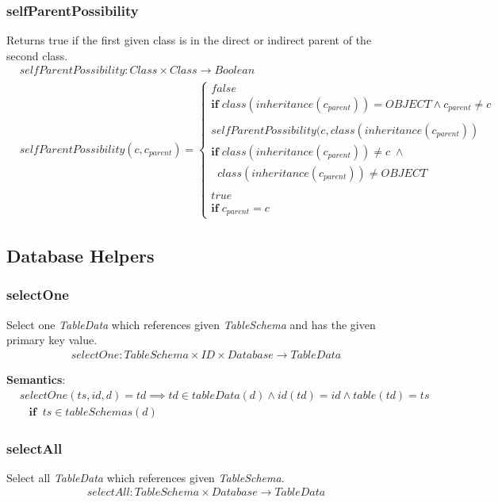 \documentclass[10pt]{article}
\begin{document}
\subsubsection{selfParentPossibility}
Returns true if the first given class is in the direct or indirect parent of the second class. 
\begin{align}
& selfParentPossibility: Class \times  Class \rightarrow Boolean \\
& selfParentPossibility(c, c_{parent}) = \begin{cases}
 false \\
 \mathbf{if} \; class(inheritance(c_{parent})) = OBJECT \land c_{parent} \neq c \\\\
 selfParentPossibility(c, class(inheritance(c_{parent}))\\
 \mathbf{if} \; class(inheritance(c_{parent})) \neq c \; \land  \\ \;\; class(inheritance(c_{parent})) \neq OBJECT \\\\
 true \\
 \mathbf{if} \; c_{parent} = c
 \end{cases}
\end{align}

\subsection{Database Helpers}
\subsubsection{selectOne}
Select one \emph{TableData} which references given \emph{TableSchema} and has the given primary key value.
\begin{align}
selectOne: TableSchema \times ID \times  Database \rightarrow TableData
\end{align}

\textbf{Semantics}:
\begin{align}
& selectOne(ts, id, d) = td \implies td \in tableData(d) \land id(td) = id \land table(td) = ts \nonumber \\
& \;\;\; \mathbf{if}  \;\; ts \in tableSchemas(d)
\end{align}

\subsubsection{selectAll}
Select all \emph{TableData} which references given \emph{TableSchema}.
\begin{align}
selectAll: TableSchema \times  Database \rightarrow TableData
\end{align}
\end{document}
